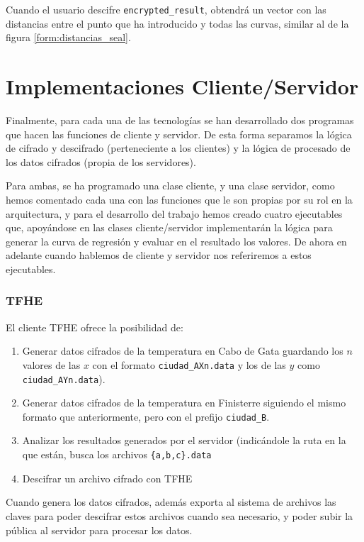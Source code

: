 Cuando el usuario descifre \verb|encrypted_result|, obtendrá un vector con las distancias entre el punto que ha introducido y todas las curvas, similar al de la figura \ref{form:distancias_seal}.

\section{Implementaciones Cliente/Servidor}

Finalmente, para cada una de las tecnologías se han desarrollado dos programas que hacen las funciones de cliente y servidor. De esta forma separamos la lógica de cifrado y descifrado (perteneciente a los clientes) y la lógica de procesado de los datos cifrados (propia de los servidores).

Para ambas, se ha programado una clase cliente, y una clase servidor, como hemos comentado cada una con las funciones que le son propias por su rol en la arquitectura, y para el desarrollo del trabajo hemos creado cuatro ejecutables que, apoyándose en las clases cliente/servidor implementarán la lógica para generar la curva de regresión y evaluar en el resultado los valores. De ahora en adelante cuando hablemos de cliente y servidor nos referiremos a estos ejecutables.

\subsubsection{TFHE}

El cliente TFHE ofrece la posibilidad de:

\begin{enumerate}
    \item Generar datos cifrados de la temperatura en Cabo de Gata guardando los $n$ valores de las $x$ con el formato \verb|ciudad_AXn.data| y los de las $y$ como  \verb|ciudad_AYn.data|).
    \item Generar datos cifrados de la temperatura en Finisterre siguiendo el mismo formato que anteriormente, pero con el prefijo \verb|ciudad_B|.
    \item Analizar los resultados generados por el servidor (indicándole la ruta en la que están, busca los archivos \verb|{a,b,c}.data|
    \item Descifrar un archivo cifrado con TFHE
\end{enumerate}{}

Cuando genera los datos cifrados, además exporta al sistema de archivos las claves para poder descifrar estos archivos cuando sea necesario, y poder subir la pública al servidor para procesar los datos.

